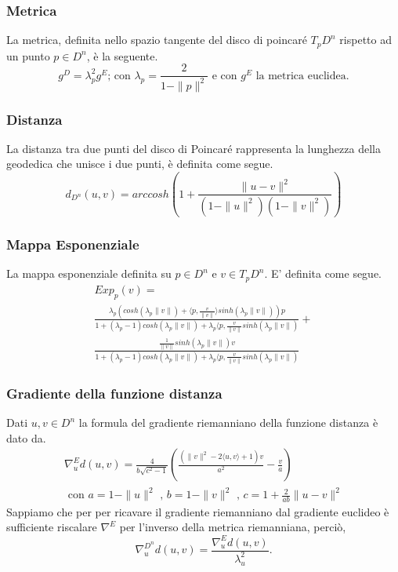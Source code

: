\documentclass[a4paper, 12pt]{article}
\begin{document}
\subsubsection{Metrica}
La metrica, definita nello spazio tangente del disco di poincaré $T_pD^n$ rispetto ad un punto $p \in D^n$, è la seguente.\\
\[g^D = \lambda_p^2 g^E \mbox{; con } \lambda_p = \frac{2}{1- \parallel p \parallel^2} \mbox{ e con } g^E \mbox{ la metrica euclidea}.\]
\subsubsection{Distanza}
La distanza tra due punti del disco di Poincaré rappresenta la lunghezza della geodedica che unisce i due punti, è definita come segue.\\
\[d_{D^n}(u, v) = arccosh(1 + \frac{\parallel u - v\parallel^2}{(1-\parallel u \parallel^2)(1-\parallel v \parallel^2)})\]
\subsubsection{Mappa Esponenziale}
La mappa esponenziale definita su $p \in D^n$ e $v \in T_pD^n$. E' definita come segue.\\
\begin{equation*}\begin{gathered}
Exp_p(v) = \\ \frac{\lambda_p (cosh(\lambda_p \parallel v \parallel) + \langle p,\frac{v}{\parallel v \parallel} \rangle sinh(\lambda_p \parallel v \parallel))p}{1 + (\lambda_p - 1) cosh(\lambda_p \parallel v \parallel) + \lambda_p \langle p, \frac{v}{\parallel v \parallel} sinh(\lambda_p \parallel v \parallel)} + \\ \frac{\frac{1}{\parallel v \parallel} sinh(\lambda_p \parallel v \parallel) v}{1 + (\lambda_p - 1) cosh(\lambda_p \parallel v \parallel) + \lambda_p \langle p, \frac{v}{\parallel v \parallel} sinh(\lambda_p \parallel v \parallel)}
\end{gathered}\end{equation*}
\subsubsection{Gradiente della funzione distanza}
Dati $u,v \in D^n$ la formula del gradiente riemanniano della funzione distanza è dato da.\\
\begin{equation*}\begin{gathered}
\nabla_u^{E} d(u,v) = \frac{4}{b \sqrt{c^2 - 1}} (\frac{(\parallel v \parallel^2 - 2\langle u,v \rangle + 1)v}{a^2} - \frac{v}{a}) \\ \mbox{ con } a = 1 - \parallel u \parallel^2 \mbox{ , } b = 1 - \parallel v \parallel^2 \mbox{ , } c = 1 + \frac{2}{ab} \parallel u - v \parallel^2
\end{gathered}\end{equation*}
Sappiamo che per per ricavare il gradiente riemanniano dal gradiente euclideo è sufficiente riscalare $\nabla^E$ per l'inverso della metrica riemanniana, perciò,\\ \[\nabla_u^{D^n} d(u,v) = \frac{\nabla_u^{E} d(u,v)}{\lambda_u^2}.\]
\end{document}
